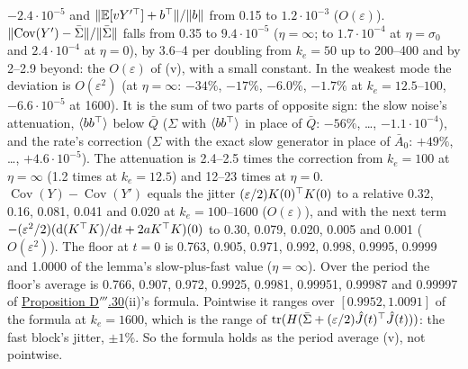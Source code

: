 \begin{sloppypar}
$-2.4\cdot10^{-5}$ and $\lVert \mathbb{E}[vY'^\top] + b^\top\rVert/\lVert b\rVert$ from 0.15 to $1.2\cdot10^{-3}$ ($O(\varepsilon)$).
$\lVert \operatorname{Cov}(Y') - \bar\Sigma\rVert/\lVert \bar\Sigma\rVert$ falls from 0.35 to $9.4\cdot10^{-5}$ ($\eta = \infty$;
to $1.7\cdot10^{-4}$ at $\eta = \sigma_0$ and $2.4\cdot10^{-4}$ at $\eta = 0$), by 3.6--4 per doubling from
$k_e = 50$ up to 200--400 and by 2--2.9 beyond: the $O(\varepsilon)$ of (v), with a small constant. In the weakest mode
the deviation is $O(\varepsilon^2)$ (at $\eta = \infty$: $-34\%$, $-17\%$, $-6.0\%$, $-1.7\%$ at
$k_e = 12.5$--$100$, $-6.6\cdot10^{-5}$ at 1600). It is the sum of two parts of opposite sign: the slow noise's
attenuation, $\langle bb^\top\rangle$ below $\bar Q$ ($\Sigma$ with $\langle bb^\top\rangle$ in place of $\bar Q$:
$-56\%$, \dots, $-1.1\cdot10^{-4}$), and the rate's correction ($\Sigma$ with the exact slow generator in place of
$\bar A_0$: $+49\%$, \dots, $+4.6\cdot10^{-5}$). The attenuation is 2.4--2.5 times the correction from $k_e = 100$ at
$\eta = \infty$ (1.2 times at $k_e = 12.5$) and 12--23 times at $\eta = 0$.
$\operatorname{Cov}(Y) - \operatorname{Cov}(Y')$ equals the jitter $(\varepsilon/2)K(0)^\top K(0)$ to a relative 0.32,
0.16, 0.081, 0.041 and 0.020 at $k_e = 100$--$1600$ ($O(\varepsilon)$), and with the next term
$-(\varepsilon^2/2)(\mathrm{d}(K^\top K)/\mathrm{d}t + 2aK^\top K)(0)$ to 0.30, 0.079, 0.020, 0.005 and 0.001
($O(\varepsilon^2)$). The floor at $t = 0$ is 0.763, 0.905, 0.971, 0.992, 0.998, 0.9995, 0.9999 and 1.0000 of the
lemma's slow-plus-fast value ($\eta = \infty$). Over the period the floor's average is 0.766, 0.907, 0.972, 0.9925,
0.9981, 0.99951, 0.99987 and 0.99997 of \hyperref[res:thmDppp:30]{Proposition D$'''$.30}(ii)'s formula. Pointwise it
ranges over $[0.9952,1.0091]$ of the formula at $k_e = 1600$, which is the range of
$\operatorname{tr}(H(\bar\Sigma + (\varepsilon/2)\hat J(t)^\top\hat J(t)))$: the fast block's jitter, $\pm1\%$. So the formula holds
as the period average (v), not pointwise.
\end{sloppypar}

